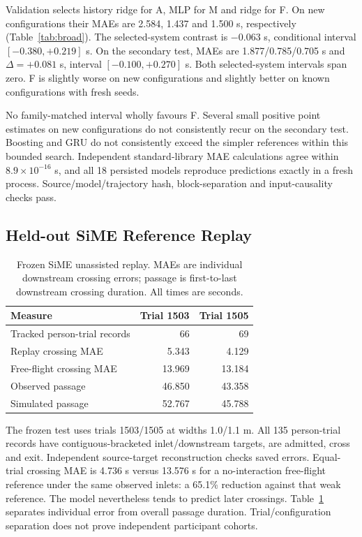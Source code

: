 \documentclass[conference]{IEEEtran}
\begin{document}
Validation selects history ridge for A, MLP for M and ridge for F. On new configurations their MAEs are 2.584, 1.437 and 1.500 s, respectively (Table~\ref{tab:broad}). The selected-system contrast is $-0.063$ s, conditional interval $[-0.380,+0.219]$ s. On the secondary test, MAEs are 1.877/0.785/0.705 s and $\Delta=+0.081$ s, interval $[-0.100,+0.270]$ s. Both selected-system intervals span zero. F is slightly worse on new configurations and slightly better on known configurations with fresh seeds.

No family-matched interval wholly favours F. Several small positive point estimates on new configurations do not consistently recur on the secondary test. Boosting and GRU do not consistently exceed the simpler references within this bounded search. Independent standard-library MAE calculations agree within $8.9\times10^{-16}$ s, and all 18 persisted models reproduce predictions exactly in a fresh process. Source/model/trajectory hash, block-separation and input-causality checks pass.

\subsection{Held-out SiME Reference Replay}
\begin{table}[!t]\centering\small
\caption{Frozen SiME unassisted replay. MAEs are individual downstream crossing errors; passage is first-to-last downstream crossing duration. All times are seconds.}
\label{tab:sime}
\begin{tabular}{lrr}\toprule Measure & Trial 1503 & Trial 1505\\\midrule
Tracked person-trial records & 66 & 69\\
Replay crossing MAE & 5.343 & 4.129\\
Free-flight crossing MAE & 13.969 & 13.184\\
Observed passage & 46.850 & 43.358\\
Simulated passage & 52.767 & 45.788\\\bottomrule
\end{tabular}
\end{table}

The frozen test uses trials 1503/1505 at widths 1.0/1.1 m. All 135 person-trial records have contiguous-bracketed inlet/downstream targets, are admitted, cross and exit. Independent source-target reconstruction checks saved errors. Equal-trial crossing MAE is 4.736 s versus 13.576 s for a no-interaction free-flight reference under the same observed inlets: a 65.1\% reduction against that weak reference. The model nevertheless tends to predict later crossings. Table~\ref{tab:sime} separates individual error from overall passage duration. Trial/configuration separation does not prove independent participant cohorts.
\end{document}
